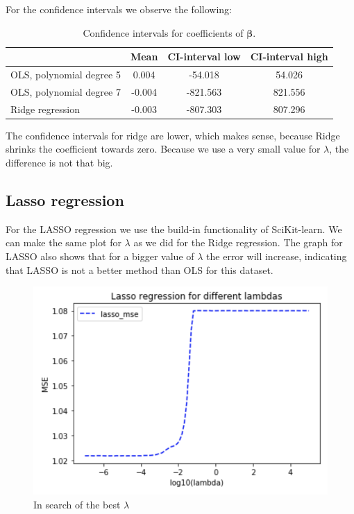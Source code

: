 \documentclass[12pt]{extarticle}
\begin{document}
For the confidence intervals we observe the following:

\begin{table}
  \begin{center}
    \caption{Confidence intervals for coefficients of $\bm{\beta}$.}
    \label{tab:table6}
    \begin{tabular}{l|c|c|c} 
      & \textbf{Mean} & \textbf{CI-interval low} & \textbf{CI-interval high}\\
      \hline
    OLS, polynomial degree 5 & 0.004 & -54.018 & 54.026\\
    OLS, polynomial degree 7 & -0.004 & -821.563 & 821.556\\
    Ridge regression & -0.003 & -807.303 & 807.296\\
    \end{tabular}
  \end{center}
\end{table}


The confidence intervals for ridge are lower, which makes sense, because Ridge shrinks the coefficient towards zero. Because we use a very small value for $\lambda$, the difference is not that big.

\subsection{Lasso regression}

For the LASSO regression we use the build-in functionality of SciKit-learn. We can make the same plot for $\lambda$ as we did for the Ridge regression. The graph for LASSO also shows that for a bigger value of $\lambda$ the error will increase, indicating that LASSO is not a better method than OLS for this dataset.

\begin{figure}
    \centering
    \includegraphics[width=0.9\linewidth]{12}
    \caption{In search of the best $\lambda$}
    \label{fig:f10}
\end{figure}
\end{document}

